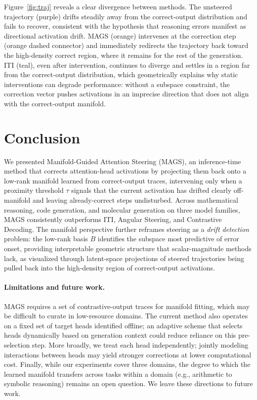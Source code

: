 \documentclass{article}
\newcommand{\ours}{MAGS}
\begin{document}
Figure~\ref{fig:traj} reveals a clear divergence between methods. The unsteered trajectory (purple) drifts steadily away from the correct-output distribution and fails to recover, consistent with the hypothesis that reasoning errors manifest as directional activation drift. MAGS (orange) intervenes at the correction step (orange dashed connector) and immediately redirects the trajectory back toward the high-density correct
region, where it remains for the rest of the generation. ITI (teal), even after intervention, continues to diverge and settles in a region far from the correct-output distribution, which geometrically explains why static interventions can degrade performance: without a subspace constraint, the correction vector pushes activations in an imprecise direction that does not align with the correct-output manifold.

\section{Conclusion}
\label{sec:conclusion}
We presented Manifold-Guided Attention Steering (\ours{}), an inference-time method that corrects attention-head activations by projecting them back onto a low-rank manifold learned from correct-output traces, intervening only when a proximity threshold $\tau$ signals that the current activation has drifted clearly off-manifold and leaving already-correct steps undisturbed.  Across mathematical reasoning, code generation, and molecular generation on three model families, \ours{} consistently outperforms ITI, Angular Steering, and Contrastive Decoding. The manifold perspective further reframes steering as a \emph{drift detection} problem: the low-rank basis $B$ identifies the subspace most predictive of error onset, providing interpretable geometric structure that scalar-magnitude methods lack, as visualized through latent-space projections of steered trajectories being pulled back into the high-density region of correct-output activations. 

\paragraph{Limitations and future work.} \ours{} requires a set of contrastive-output traces for manifold fitting, which may be difficult to curate in low-resource domains. The current method also operates on a fixed set of target heads identified offline; an adaptive scheme that selects heads dynamically based on generation context could reduce reliance on this pre-selection step.  More broadly, we treat each head independently; jointly modeling interactions between heads may yield stronger corrections at lower computational cost.  Finally, while our experiments cover three domains, the degree to which the learned manifold transfers across tasks within a domain (e.g., arithmetic to symbolic reasoning) remains an open question. We leave these directions to future work.
\end{document}
